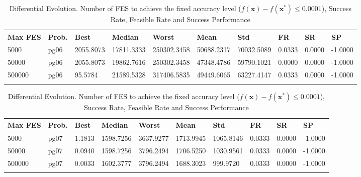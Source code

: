 \documentclass[10pt, a4paper]{book}
\begin{document}
\begin{center}
\begin{longtable}{l l l l l l l l l l}
\textbf{Max FES} & \textbf{Prob.} & \textbf{Best} & \textbf{Median} & \textbf{Worst} & \textbf{Mean} & \textbf{Std} & \textbf{FR} & \textbf{SR} & \textbf{SP} \\
\hline
5000 & pg06 & 2055.8073 & 17811.3333 & 250302.3458 & 50688.2317 & 70032.5089 & 0.0333 & 0.0000 & -1.0000 \\
50000 & pg06 & 2055.8073 & 19862.7616 & 250302.3458 & 47348.4786 & 59790.1021 & 0.0000 & 0.0000 & -1.0000 \\
500000 & pg06 & 95.5784 & 21589.5328 & 317406.5835 & 49449.6065 & 63227.4147 & 0.0333 & 0.0000 & -1.0000 \\

\caption{ Differential Evolution. Number of FES to achieve the fixed accuracy level ($f(\mathbf{x}) - f(\mathbf{x}^{*}) \leq 0.0001$), Success Rate, Feasible Rate and Success Performance }
\end{longtable}
\end{center}

\begin{center}
\begin{longtable}{l l l l l l l l l l}
\textbf{Max FES} & \textbf{Prob.} & \textbf{Best} & \textbf{Median} & \textbf{Worst} & \textbf{Mean} & \textbf{Std} & \textbf{FR} & \textbf{SR} & \textbf{SP} \\
\hline
5000 & pg07 & 1.1813 & 1598.7256 & 3637.9277 & 1713.9945 & 1065.8146 & 0.0333 & 0.0000 & -1.0000 \\
50000 & pg07 & 0.0940 & 1598.7256 & 3796.2494 & 1706.5250 & 1030.9561 & 0.0333 & 0.0000 & -1.0000 \\
500000 & pg07 & 0.0033 & 1602.3777 & 3796.2494 & 1688.3023 & 999.9720 & 0.0333 & 0.0000 & -1.0000 \\

\caption{ Differential Evolution. Number of FES to achieve the fixed accuracy level ($f(\mathbf{x}) - f(\mathbf{x}^{*}) \leq 0.0001$), Success Rate, Feasible Rate and Success Performance }
\end{longtable}
\end{center}
\end{document}
